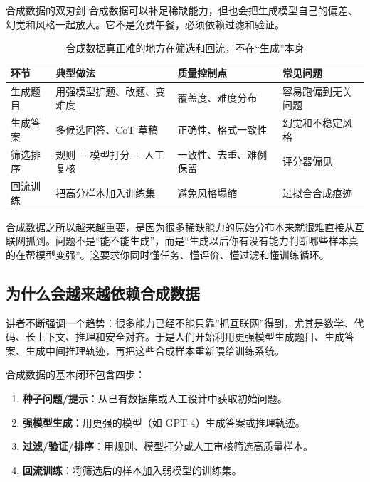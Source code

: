 \documentclass[a4paper]{article}
\begin{document}
\begin{warningbox}{合成数据的双刃剑}
合成数据可以补足稀缺能力，但也会把生成模型自己的偏差、幻觉和风格一起放大。它不是免费午餐，必须依赖过滤和验证。
\end{warningbox}

\begin{table}[H]
\centering
\begin{tabular}{p{}p{}p{}p{}}
\toprule
\textbf{环节} & \textbf{典型做法} & \textbf{质量控制点} & \textbf{常见问题} \\
\midrule
生成题目 & 用强模型扩题、改题、变难度 & 覆盖度、难度分布 & 容易跑偏到无关问题 \\
生成答案 & 多候选回答、CoT 草稿 & 正确性、格式一致性 & 幻觉和不稳定风格 \\
筛选排序 & 规则 + 模型打分 + 人工复核 & 一致性、去重、难例保留 & 评分器偏见 \\
回流训练 & 把高分样本加入训练集 & 避免风格塌缩 & 过拟合合成痕迹 \\
\bottomrule
\end{tabular}
\caption{合成数据真正难的地方在筛选和回流，不在“生成”本身}
\end{table}

合成数据之所以越来越重要，是因为很多稀缺能力的原始分布本来就很难直接从互联网抓到。问题不是“能不能生成”，而是“生成以后你有没有能力判断哪些样本真的在帮模型变强”。这要求你同时懂任务、懂评价、懂过滤和懂训练循环。

\subsection{为什么会越来越依赖合成数据}

讲者不断强调一个趋势：很多能力已经不能只靠”抓互联网”得到，尤其是数学、代码、长上下文、推理和安全对齐。于是人们开始利用更强模型生成题目、生成答案、生成中间推理轨迹，再把这些合成样本重新喂给训练系统。

合成数据的基本闭环包含四步：
\begin{enumerate}
    \item \textbf{种子问题/提示}：从已有数据集或人工设计中获取初始问题。
    \item \textbf{强模型生成}：用更强的模型（如 GPT-4）生成答案或推理轨迹。
    \item \textbf{过滤/验证/排序}：用规则、模型打分或人工审核筛选高质量样本。
    \item \textbf{回流训练}：将筛选后的样本加入弱模型的训练集。
\end{enumerate}
\end{document}
